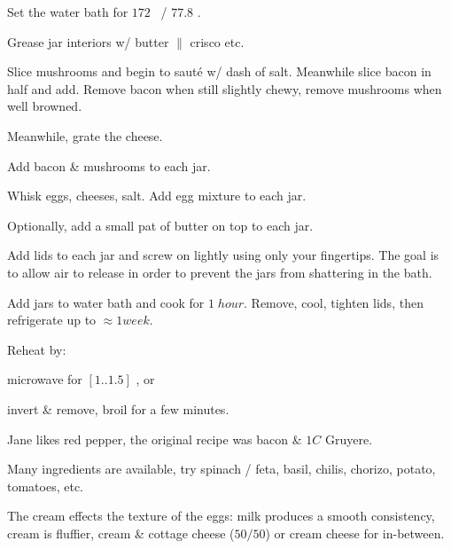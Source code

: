 \begin{preparation}

\item Set the water bath for $172$ \Fahrenheit~/ $77.8$ \Celsius.

\item Grease jar interiors w/ butter $\|$ crisco etc.

\item Slice mushrooms and begin to saut\'{e} w/ dash of salt. Meanwhile slice
    bacon in half and add.
    Remove bacon when still slightly chewy, remove mushrooms when well browned.

\item Meanwhile, grate the cheese.

\item Add bacon \& mushrooms to each jar.

\item Whisk eggs, cheeses, salt. Add egg mixture to each jar.

\item Optionally, add a small pat of butter on top to each jar.

\item Add lids to each jar and screw on lightly using only your fingertips.
    The goal is to allow air to release in order to prevent the jars from
    shattering in the bath.

\item Add jars to water bath and cook for $1\; hour$. Remove, cool, tighten
    lids, then refrigerate up to $\approx1 week$.

\item Reheat by:
\begin{inparaenum}
\item microwave for $[1..1.5]$ \minute, or
\item invert \& remove, broil for a few minutes.
\end{inparaenum}
\end{preparation}

\begin{variation}
\item Jane likes red pepper, the original recipe was bacon \& $1 C$ Gruyere.

\item Many ingredients are available, try spinach / feta, basil, chilis,
chorizo, potato, tomatoes, etc.

\end{variation}

\begin{experiments}
\item The cream effects the texture of the eggs: milk produces a smooth consistency, cream is fluffier, cream
\& cottage cheese ($50/50$) or cream cheese for in-between.

\end{experiments}

\recipeend%
